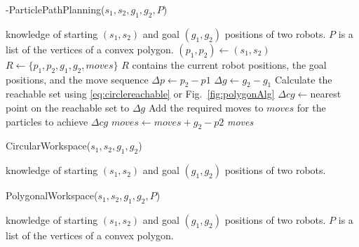 \begin{algorithm}[htb]
\caption{ { -ParticlePathPlanning}($s_1,s_2,g_1,g_2,P$)}\label{alg:optimalAlg}
\begin{algorithmic}[1]
\Require knowledge of starting $(s_1,s_2)$ and goal $(g_1,g_2)$ positions of  two robots. 
 $P$ is a list of the vertices of a convex polygon. 
 \State $(p_1,p_2) \gets (s_1,s_2) $
 \State $R \gets   \{ p_1,p_2,g_1,g_2  ,moves\} $ \Comment $R$ contains the current robot positions, the goal positions, and the move sequence
 \State $\Delta p \gets p_2-p1$
 \State $\Delta g \gets g_2-g_1$
\State Calculate the reachable set using \eqref{eq:circlereachable} or Fig.~\ref{fig:polygonAlg}
\State $ \Delta cg\gets $nearest point on the reachable set to $\Delta g$
\State Add the required moves to $moves$ for the particles to achieve $\Delta cg$ 
\EndWhile
\State $moves \gets moves+ {g_2 - p2}$
\State \Return \emph{moves}
\end{algorithmic}
\end{algorithm}

\begin{algorithm}[htb]
\caption{ { \sc CircularWorkspace}($s_1,s_2,g_1,g_2$)}\label{alg:circularReachbale}
\begin{algorithmic}[1]
\Require knowledge of starting $(s_1,s_2)$ and goal $(g_1,g_2)$ positions of  two robots. 
\end{algorithmic}
\end{algorithm}

\begin{algorithm}[htb]
\caption{ { \sc PolygonalWorkspace}($s_1,s_2,g_1,g_2, P$)}\label{alg:polygonReachbale}
\begin{algorithmic}[1]
\Require knowledge of starting $(s_1,s_2)$ and goal $(g_1,g_2)$ positions of  two robots. 
$P$ is a list of the vertices of a convex polygon. 

\end{algorithmic}
\end{algorithm}


